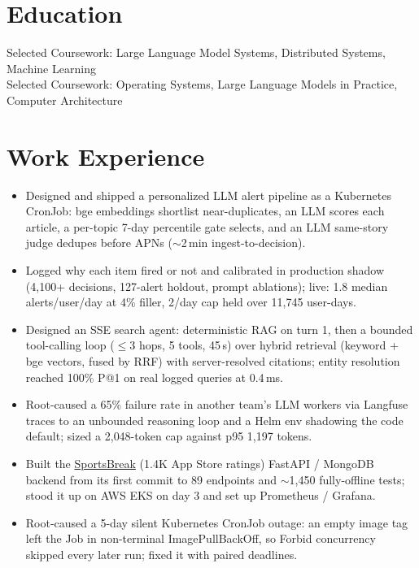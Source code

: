 \documentclass[11pt, letterpaper]{article}
\begin{document}

\section{Education}
Selected Coursework: Large Language Model Systems, Distributed Systems, Machine Learning\\[1pt]
Selected Coursework: Operating Systems, Large Language Models in Practice, Computer Architecture

\section{Work Experience}
\begin{itemize}
  \item Designed and shipped a personalized LLM alert pipeline as a Kubernetes CronJob: bge embeddings shortlist near-duplicates, an LLM scores each article, a per-topic 7-day percentile gate selects, and an LLM same-story judge dedupes before APNs ($\sim$2\,min ingest-to-decision).
  \item Logged why each item fired or not and calibrated in production shadow (4{,}100+ decisions, 127-alert holdout, prompt ablations); live: 1.8 median alerts/user/day at 4\% filler, 2/day cap held over 11{,}745 user-days.
  \item Designed an SSE search agent: deterministic RAG on turn 1, then a bounded tool-calling loop ($\le$3 hops, 5 tools, 45\,s) over hybrid retrieval (keyword + bge vectors, fused by RRF) with server-resolved citations; entity resolution reached 100\% P@1 on real logged queries at 0.4\,ms.
  \item Root-caused a 65\% failure rate in another team's LLM workers via Langfuse traces to an unbounded reasoning loop and a Helm env shadowing the code default; sized a 2{,}048-token cap against p95 1{,}197 tokens.
  \item Built the \href{https://apps.apple.com/app/id6762649287}{SportsBreak} (1.4K App Store ratings) FastAPI / MongoDB backend from its first commit to 89 endpoints and $\sim$1{,}450 fully-offline tests; stood it up on AWS EKS on day 3 and set up Prometheus / Grafana.
  \item Root-caused a 5-day silent Kubernetes CronJob outage: an empty image tag left the Job in non-terminal ImagePullBackOff, so Forbid concurrency skipped every later run; fixed it with paired deadlines.
\end{itemize}
\end{document}
